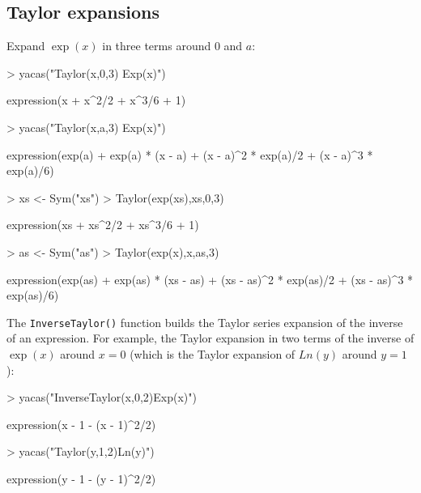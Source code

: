 \documentclass[]{article}
\newcommand{\code}[1]{{\tt #1}}
\begin{document}
\subsection{Taylor expansions} 

Expand $\exp(x)$ in three terms
around $0$ and $a$:
\begin{Schunk}
\begin{Sinput}
> yacas("Taylor(x,0,3) Exp(x)")
\end{Sinput}
\begin{Soutput}
expression(x + x^2/2 + x^3/6 + 1)
\end{Soutput}
\begin{Sinput}
> yacas("Taylor(x,a,3) Exp(x)")
\end{Sinput}
\begin{Soutput}
expression(exp(a) + exp(a) * (x - a) + (x - a)^2 * exp(a)/2 + 
    (x - a)^3 * exp(a)/6)
\end{Soutput}
\end{Schunk}

\begin{Schunk}
\begin{Sinput}
> xs <- Sym("xs")
> Taylor(exp(xs),xs,0,3)
\end{Sinput}
\begin{Soutput}
expression(xs + xs^2/2 + xs^3/6 + 1)
\end{Soutput}
\begin{Sinput}
> as <- Sym("as")
> Taylor(exp(x),x,as,3)
\end{Sinput}
\begin{Soutput}
expression(exp(as) + exp(as) * (xs - as) + (xs - as)^2 * exp(as)/2 + 
    (xs - as)^3 * exp(as)/6)
\end{Soutput}
\end{Schunk}

The \code{InverseTaylor()} function builds the Taylor series expansion of the
inverse of an expression. For example, the Taylor expansion in two
terms of the inverse of $\exp(x)$ around $x=0$ (which is the Taylor
expansion of $Ln(y)$ around $y=1$):
\begin{Schunk}
\begin{Sinput}
> yacas("InverseTaylor(x,0,2)Exp(x)")
\end{Sinput}
\begin{Soutput}
expression(x - 1 - (x - 1)^2/2)
\end{Soutput}
\begin{Sinput}
> yacas("Taylor(y,1,2)Ln(y)")
\end{Sinput}
\begin{Soutput}
expression(y - 1 - (y - 1)^2/2)
\end{Soutput}
\end{Schunk}
\end{document}
